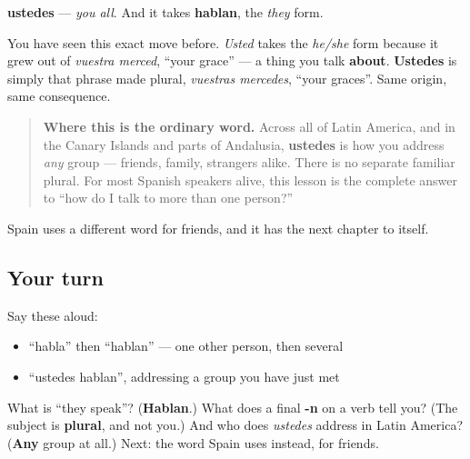 \begin{grammarlens}[title={Grammar Lens: the form does a second job, exactly as habla did}]
\textbf{ustedes} — \emph{you all}. And it takes \textbf{hablan}, the \emph{they} form.

You have seen this exact move before. \emph{Usted} takes the \emph{he/she} form because it grew out of \emph{vuestra merced}, \textquotedblleft{}your grace\textquotedblright{} — a thing you talk \textbf{about}. \textbf{Ustedes} is simply that phrase made plural, \emph{vuestras mercedes}, \textquotedblleft{}your graces\textquotedblright{}. Same origin, same consequence.

\begin{quote}
\textbf{Where this is the ordinary word.} Across all of Latin America, and in the Canary Islands and parts of Andalusia, \textbf{ustedes} is how you address \emph{any} group — friends, family, strangers alike. There is no separate familiar plural. For most Spanish speakers alive, this lesson is the complete answer to \textquotedblleft{}how do I talk to more than one person?\textquotedblright{}
\end{quote}

Spain uses a different word for friends, and it has the next chapter to itself.
\end{grammarlens}

\subsection*{Your turn}
Say these aloud:

\begin{itemize}
\raggedright
  \item \textquotedblleft{}habla\textquotedblright{} then \textquotedblleft{}hablan\textquotedblright{} — one other person, then several
  \item \textquotedblleft{}ustedes hablan\textquotedblright{}, addressing a group you have just met
\end{itemize}

\begin{tcolorbox}[breakable,colback=teal!4,colframe=teal!35!black,title={Before you move on}]
What is \textquotedblleft{}they speak\textquotedblright{}? (\textbf{Hablan}.) What does a final \textbf{-n} on a verb tell you? (The subject is \textbf{plural}, and not you.) And who does \emph{ustedes} address in Latin America? (\textbf{Any} group at all.) Next: the word Spain uses instead, for friends.
\end{tcolorbox}
